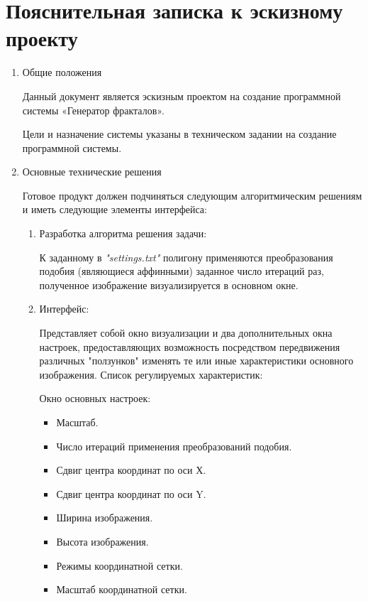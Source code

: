 \documentclass[a4paper,12pt,preview]{report} %
\begin{document}
	\section*{Пояснительная записка к эскизному проекту}
	
	\begin{enumerate}
		\item Общие положения 
		
		Данный документ является эскизным проектом на создание программной системы «Генератор фракталов».
		
		Цели и назначение системы указаны в техническом задании на создание программной системы.
		
		\item Основные технические решения
		
		Готовое продукт должен подчиняться следующим алгоритмическим решениям и иметь следующие элементы интерфейса:
		
		\begin{enumerate}
			\item Разработка алгоритма решения задачи:
			
			К заданному в \textit{"settings.txt"} полигону применяются преобразования подобия (являющиеся аффинными) заданное число итераций раз, полученное изображение визуализируется в основном окне.
			
			\item Интерфейс:
			
			Представляет собой окно визуализации и два дополнительных окна настроек, предоставляющих возможность посредством передвижения различных "ползунков" изменять те или иные характеристики основного изображения. Список регулируемых характеристик:
			
			Окно основных настроек:
				
				\begin{itemize}
					\item Масштаб.
					\item Число итераций применения преобразований подобия.
					\item Сдвиг центра координат по оси Х.
					\item Сдвиг центра координат по оси Y.
					\item Ширина изображения.
					\item Высота изображения.
					\item Режимы координатной сетки.
					\item Масштаб координатной сетки.
				\end{itemize}
				

\end{enumerate}
\end{enumerate}
\end{document}
